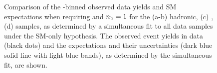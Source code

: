 \begin{figure}[t!]
\begin{center}
{    } 
    \caption{\label{fig:best-fit-le3j1b} Comparison of the
      \scalht-binned observed data yields and SM expectations when
      requiring \njetlow and $n_{\text{b}} = 1$ for the (a-b) hadronic, (c)
      \mj, (d) \gj samples, as determined by a
      simultaneous fit to all data samples under the SM-only
      hypothesis. The observed event yields in data (black dots) and
      the expectations and their uncertainties (dark blue solid line
      with light blue bands), as determined by the simultaneous fit,
      are shown. %
      }
  \end{center}
\end{figure}


